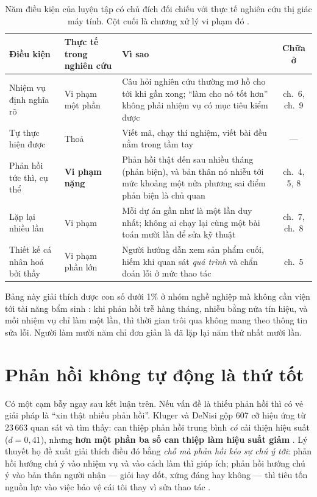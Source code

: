 \documentclass[../hieu-suat.tex]{subfiles}
\begin{document}
\begin{table}[H]\centering\footnotesize
\caption{Năm điều kiện của luyện tập có chủ đích \cite{ericsson1993,ericsson2021} đối chiếu với thực tế nghiên cứu thị giác máy tính. Cột cuối là chương xử lý vi phạm đó \nM{}.}
\begin{tabularx}{\linewidth}{L{3.1cm} L{4.3cm} Y c}
\toprule
\textbf{Điều kiện} & \textbf{Thực tế trong nghiên cứu} & \textbf{Vì sao} & \textbf{Chữa ở}\\
\midrule
Nhiệm vụ định nghĩa rõ & Vi phạm một phần & Câu hỏi nghiên cứu thường mơ hồ cho tới khi gần xong; ``làm cho nó tốt hơn'' không phải nhiệm vụ có mục tiêu kiểm được & ch.~6, ch.~9\\
Tự thực hiện được & Thoả & Viết mã, chạy thí nghiệm, viết bài đều nằm trong tầm tay & ---\\
Phản hồi tức thì, cụ thể & \textbf{Vi phạm nặng} & Phản hồi thật đến sau nhiều tháng (phản biện), và bản thân nó nhiễu tới mức khoảng một nửa phương sai điểm phản biện là chủ quan \cite{cortes2021} & ch.~4, 5, 8\\
Lặp lại nhiều lần & Vi phạm & Mỗi dự án gần như là một lần duy nhất; không ai chạy lại cùng một bài toán mười lần để sửa kỹ thuật & ch.~7, ch.~8\\
Thiết kế cá nhân hoá bởi thầy & Vi phạm phần lớn & Người hướng dẫn xem sản phẩm cuối, hiếm khi quan sát \emph{quá trình} và chẩn đoán lỗi ở mức thao tác & ch.~5\\
\bottomrule
\end{tabularx}
\end{table}

Bảng này giải thích được con số dưới 1\% ở nhóm nghề nghiệp mà không cần viện tới tài năng bẩm sinh \nM{}: khi phản hồi trễ hàng tháng, nhiễu bằng nửa tín hiệu, và mỗi nhiệm vụ chỉ làm một lần, thì thời gian trôi qua không mang theo thông tin sửa lỗi. Người làm mười năm chỉ đơn giản là đã lặp lại năm thứ nhất mười lần.

\section{Phản hồi không tự động là thứ tốt}

Có một cạm bẫy ngay sau kết luận trên. Nếu vấn đề là thiếu phản hồi thì có vẻ giải pháp là ``xin thật nhiều phản hồi''. Kluger và DeNisi \cite{kluger1996} gộp 607 cỡ hiệu ứng từ 23\,663 quan sát và tìm thấy: can thiệp phản hồi trung bình \emph{có} cải thiện hiệu suất (\(d = 0{,}41\)), nhưng \textbf{hơn một phần ba số can thiệp làm hiệu suất giảm} \nD{}. Lý thuyết họ đề xuất giải thích điều đó bằng \emph{chỗ mà phản hồi kéo sự chú ý tới}: phản hồi hướng chú ý vào nhiệm vụ và vào cách làm thì giúp ích; phản hồi hướng chú ý vào bản thân người nhận --- giỏi hay dốt, xứng đáng hay không --- thì tiêu tốn nguồn lực vào việc bảo vệ cái tôi thay vì sửa thao tác \nT{}.
\end{document}
